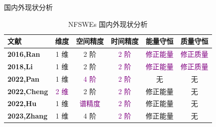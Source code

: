 \documentclass[aspectratio=169]{beamer}
\begin{document}
		\begin{frame}{国内外现状分析}
			\begin{table}[htbp]
				\centering
				\small
				\caption{NFSWEs 国内外现状分析}
					\begin{tabular}{lccccc}
					\toprule
					\textcolor[rgb]{0.227,0.373,0.306}{\textbf{文献}} & \textcolor[rgb]{0.227,0.373,0.306}{\textbf{维度}} & \textcolor[rgb]{0.227,0.373,0.306}{\textbf{空间精度}} & \textcolor[rgb]{0.227,0.373,0.306}{\textbf{时间精度}} & \textcolor[rgb]{0.227,0.373,0.306}{\textbf{能量守恒}} & \textcolor[rgb]{0.227,0.373,0.306}{\textbf{质量守恒}} \\
					\midrule
					\textcolor[rgb]{0.227,0.373,0.306}{\textbf{\cite{ranLinearlyImplicitConservative2016}{2016,Ran}}} & 1 维   & 2 阶   & \textcolor{purple}{2 阶}   & \textcolor{purple}{修正能量}  & \textcolor{purple}{修正质量} \\
					\midrule
					\textcolor[rgb]{0.227,0.373,0.306}{\textbf{\cite{liFastEnergyConserving2018}{2018,Li}}} & 1 维   & 2 阶   & \textcolor{purple}{2 阶}   & \textcolor{purple}{修正能量}  & \textcolor{purple}{修正质量} \\
					\midrule
					\textcolor[rgb]{0.227,0.373,0.306}{\textbf{\cite{panFourthorderDifferenceScheme2022}{2022,Pan}}} & 1 维   & \textcolor{purple}{4 阶}   & \textcolor{purple}{2 阶}   & 无     & 无 \\
					\midrule
					\textcolor[rgb]{0.227,0.373,0.306}{\textbf{\cite{chengConvergenceEnergyconservingScheme2022}{2022,Cheng}}} & \textcolor{purple}{2 维}   & 2 阶   & \textcolor{purple}{2 阶}   & 修正能量  & 无 \\
					\midrule
					\textcolor[rgb]{0.227,0.373,0.306}{\textbf{\cite{huEfficientEnergyPreserving2022}{2022,Hu}}} & 1 维   & \textcolor{purple}{谱精度}   & \textcolor{purple}{2 阶}   & 修正能量  & 无 \\
					\midrule
					\textcolor[rgb]{0.227,0.373,0.306}{\textbf{\cite{zhangHighorderStructurepreservingDifference2023}{2023,Zhang}}} & 1 维   & 4 阶   & \textcolor{purple}{2 阶}   & 修正能量  & 无 \\
					\bottomrule
					\end{tabular}%
				\label{tab:2}%
				\end{table}%
				\end{frame}
	
\end{document}

